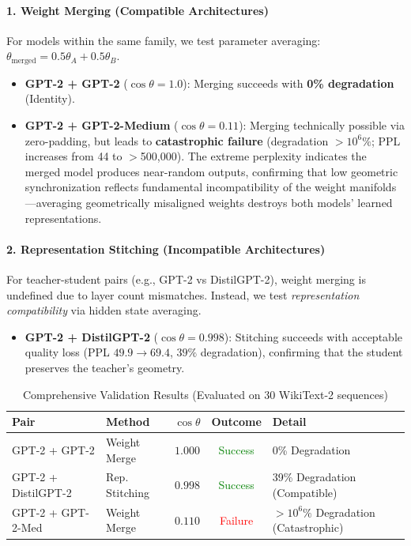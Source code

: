 \documentclass[10pt]{article} %
\theoremstyle{plain}
\theoremstyle{definition}
\theoremstyle{remark}
\begin{document}
\paragraph{1. Weight Merging (Compatible Architectures)}
For models within the same family, we test parameter averaging: $\theta_{\text{merged}} = 0.5\theta_A + 0.5\theta_B$.
\begin{itemize}
    \item \textbf{GPT-2 + GPT-2} ($\cos \theta = 1.0$): Merging succeeds with \textbf{0\% degradation} (Identity).
    \item \textbf{GPT-2 + GPT-2-Medium} ($\cos \theta = 0.11$): Merging technically possible via zero-padding, but leads to \textbf{catastrophic failure} (degradation $> 10^6\%$; PPL increases from 44 to $>$500,000). The extreme perplexity indicates the merged model produces near-random outputs, confirming that low geometric synchronization reflects fundamental incompatibility of the weight manifolds---averaging geometrically misaligned weights destroys both models' learned representations.
\end{itemize}

\paragraph{2. Representation Stitching (Incompatible Architectures)}
For teacher-student pairs (e.g., GPT-2 vs DistilGPT-2), weight merging is undefined due to layer count mismatches. Instead, we test \textit{representation compatibility} via hidden state averaging.
\begin{itemize}
    \item \textbf{GPT-2 + DistilGPT-2} ($\cos \theta = 0.998$): Stitching succeeds with acceptable quality loss (PPL $49.9 \to 69.4$, $39\%$ degradation), confirming that the student preserves the teacher's geometry.
\end{itemize}

\begin{table}[htbp]
\centering
\caption{Comprehensive Validation Results (Evaluated on 30 WikiText-2 sequences)}
\label{tab:merging}
\small
\begin{tabular}{ll ccl}
\toprule
\textbf{Pair} & \textbf{Method} & \textbf{$\cos \theta$} & \textbf{Outcome} & \textbf{Detail} \\
\midrule
GPT-2 + GPT-2 & Weight Merge & $1.000$ & \textcolor{green}{Success} & 0\% Degradation \\
GPT-2 + DistilGPT-2 & Rep. Stitching & $0.998$ & \textcolor{green}{Success} & 39\% Degradation (Compatible) \\
GPT-2 + GPT-2-Med & Weight Merge & $0.110$ & \textcolor{red}{Failure} & $> 10^6\%$ Degradation (Catastrophic) \\
\bottomrule
\end{tabular}
\end{table}
\end{document}
